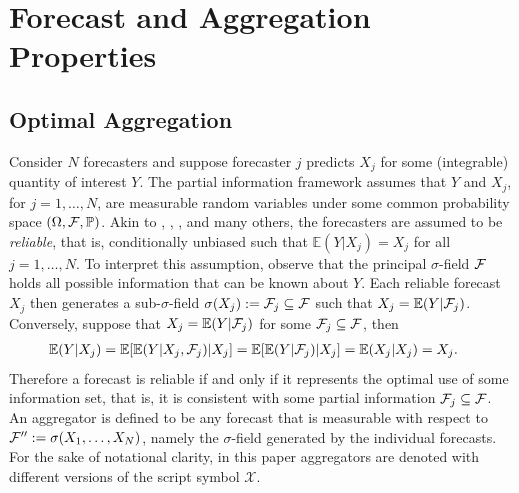 \documentclass[11pt]{article}
\renewcommand{\P}{\mathbb{P}}
\newcommand{\E}{\mathbb{E}}
\theoremstyle{definition}
\theoremstyle{definition}
\def\F{{\cal F}}
\def\P{{\mathbb P}}
\def\E{{\mathbb E}}
\begin{document}
\section{Forecast and Aggregation Properties} \label{propertiesS}
\subsection{Optimal Aggregation}


Consider $N$ forecasters and suppose forecaster $j$ predicts $X_j$ for
some (integrable) quantity of interest $Y$.  The partial information
framework assumes that $Y$ and $X_j$, for $j = 1, \dots, N$, are
measurable random variables under some common probability space
$(\Omega, \F , \P)$.
Akin to \cite{Ranjan08}, \cite{jolliffe2012forecast},  \cite{murphy1987general}, and many others, 
 the forecasters are assumed to be \textit{reliable}, that is, conditionally unbiased
such that $\E(Y | X_j) = X_j$ for all $j = 1, \dots, N$.  To interpret
this assumption, observe that the principal $\sigma$-field $\F$ holds
all possible information that can be known about $Y$. Each
reliable forecast $X_j$ then generates a sub-$\sigma$-field
$\sigma(X_j) := \F_j \subseteq \F$ such that $X_j
= \E(Y|\F_j)$. Conversely, suppose that $X_j = \E(Y|\F_j)$ for some
$\F_j \subseteq \F$, then
\begin{align*}
\E(Y | X_j) &= \E[\E(Y|X_j,\F_j)|X_j] = \E[\E(Y|\F_j)|X_j] = \E(X_j|X_j) = X_j.
\end{align*}
Therefore a forecast is reliable if and only if it represents the optimal use of some information set, that is, it is consistent with some partial information $\F_j \subseteq \F$.
 An aggregator is defined to be any forecast that is measurable with respect to $\F'' := \sigma(X_1, \dots, X_N)$, namely the $\sigma$-field generated by the individual forecasts. For the sake of notational clarity, in this paper aggregators are denoted with different versions of the script symbol $\mathcal{X}$.
\end{document}
